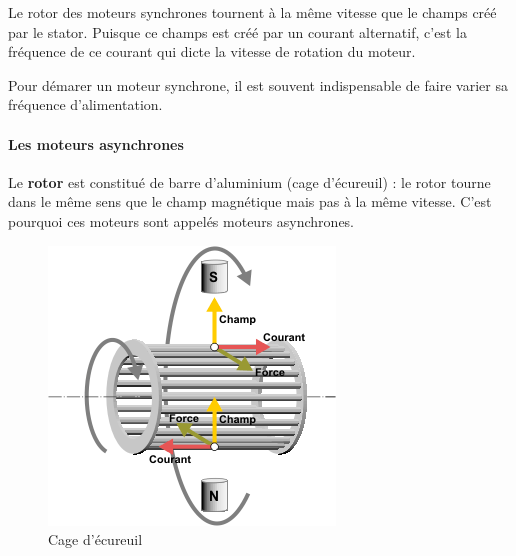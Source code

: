 \documentclass[10pt,fleqn]{article} %
\begin{document}
\begin{aretenir}
  Le rotor des moteurs synchrones tournent à la même vitesse que le champs créé par le stator. Puisque ce champs est créé par un courant alternatif, c'est la fréquence de ce courant qui dicte la vitesse de rotation du moteur.
\end{aretenir}

\begin{warn}
  Pour démarer un moteur synchrone, il est souvent indispensable de faire varier sa fréquence d'alimentation.
\end{warn}

\paragraph{Les moteurs asynchrones}
Le \textbf{rotor} est constitué de barre d’aluminium (cage d’écureuil) : le rotor tourne dans le même sens que le champ magnétique mais pas à la même vitesse. C'est pourquoi ces moteurs sont appelés moteurs asynchrones.

\begin{figure}[h]
  \centering
  \includegraphics[width=.3\textwidth]{images/moteur-asynchrone}
  \caption{Cage d'écureuil}
  \label{fig:ecu}
\end{figure}
\pagebreak
\end{document}
